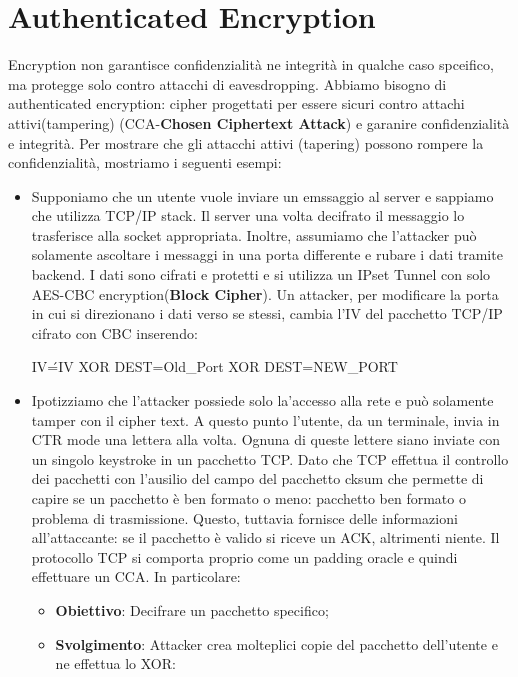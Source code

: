 \documentclass{article}
\theoremstyle{remark}
\begin{document}
\section{Authenticated Encryption}
Encryption non garantisce confidenzialità ne integrità in qualche caso spceifico, ma protegge solo contro attacchi di eavesdropping. Abbiamo bisogno di authenticated encryption: cipher progettati per essere sicuri contro attachi attivi(tampering) (CCA-\textbf{Chosen Ciphertext Attack}) e garanire confidenzialità e integrità.
Per mostrare che gli attacchi attivi (tapering) possono rompere la confidenzialità, mostriamo i seguenti esempi:
\begin{itemize}
    \item Supponiamo che un utente vuole inviare un emssaggio al server e sappiamo che utilizza TCP/IP stack. Il server una volta decifrato il messaggio lo trasferisce alla socket appropriata. Inoltre, assumiamo che l'attacker può solamente ascoltare i messaggi in una porta differente e rubare i dati tramite backend. I dati sono cifrati e protetti e si utilizza un IPset Tunnel con solo AES-CBC encryption(\textbf{Block Cipher}). 
    Un attacker, per modificare la porta in cui si direzionano i dati verso se stessi, cambia l'IV del pacchetto TCP/IP cifrato con CBC inserendo: 
    \begin{center}
        IV\'=IV XOR DEST=Old\_Port XOR DEST=NEW\_PORT
    \end{center}
    \item Ipotizziamo che l'attacker possiede solo la'accesso alla rete e può solamente tamper con il cipher text. A questo punto l'utente, da un terminale, invia in CTR mode una lettera alla volta. Ognuna di queste lettere siano inviate con un singolo keystroke in un pacchetto TCP. Dato che TCP effettua il controllo dei pacchetti con l'ausilio del campo del pacchetto cksum che permette di capire se un pacchetto è ben formato o meno: pacchetto ben formato o problema di trasmissione.
    Questo, tuttavia fornisce delle informazioni all'attaccante: se il pacchetto è valido si riceve un ACK, altrimenti niente. Il protocollo TCP si comporta proprio come un padding oracle e quindi effettuare un CCA.
    In particolare:
    \begin{itemize}
        \item \textbf{Obiettivo}: Decifrare un pacchetto specifico;
        \item \textbf{Svolgimento}: Attacker crea molteplici copie del pacchetto dell'utente e ne effettua lo XOR:
            \begin{center}

\end{center}
\end{itemize}
\end{itemize}
\end{document}
